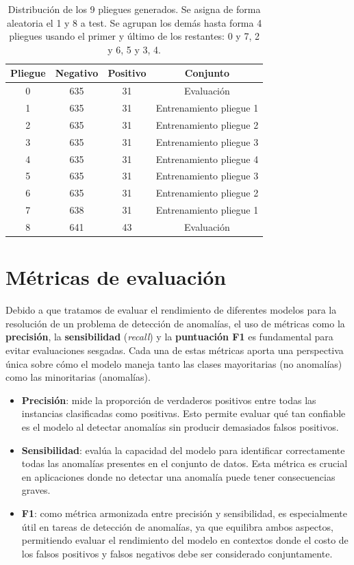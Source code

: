\documentclass[12pt,letterpaper]{article}
\begin{document}
\begin{table}[htp]
    \centering
    \begin{tabular}{cccc}
    \hline
    \textbf{Pliegue} & \textbf{Negativo} & \textbf{Positivo} & \textbf{Conjunto}\\ \hline
        0 & 635 & 31 & Evaluación \\ 
        1 & 635 & 31 & Entrenamiento pliegue 1 \\ 
        2 & 635 & 31 & Entrenamiento pliegue 2\\ 
        3 & 635 & 31 & Entrenamiento pliegue 3\\ 
        4 & 635 & 31 & Entrenamiento pliegue 4\\ 
        5 & 635 & 31 & Entrenamiento pliegue 3\\ 
        6 & 635 & 31 & Entrenamiento pliegue 2 \\
        7 & 638 & 31 & Entrenamiento pliegue 1\\ 
        8 & 641 & 43 & Evaluación \\ \hline
    \end{tabular}
    \caption{Distribución de los 9 pliegues generados. Se asigna de forma aleatoria el 1 y 8 a test. Se agrupan los demás hasta forma 4 pliegues usando el primer y último de los restantes: 0 y 7, 2 y 6, 5 y 3, 4.}
    \label{tab:ValidacionCruzada}
\end{table}

\section{Métricas de evaluación}\label{sec:Metricas}

Debido a que tratamos de evaluar el rendimiento de diferentes modelos para la resolución de un problema de detección de anomalías, 
el uso de métricas como la \textbf{precisión}, la \textbf{sensibilidad} (\textit{recall}) y la \textbf{puntuación F1} es fundamental para evitar evaluaciones sesgadas. 
Cada una de estas métricas aporta una perspectiva única sobre cómo el modelo maneja tanto las clases mayoritarias (no anomalías) como las minoritarias (anomalías).

\begin{itemize}
    \item \textbf{Precisión}: mide la proporción de verdaderos positivos entre todas las instancias clasificadas como positivas. Esto permite evaluar qué tan confiable es el modelo al detectar anomalías sin producir demasiados falsos positivos.
    \item \textbf{Sensibilidad}: evalúa la capacidad del modelo para identificar correctamente todas las anomalías presentes en el conjunto de datos. Esta métrica es crucial en aplicaciones donde no detectar una anomalía puede tener consecuencias graves.
    \item \textbf{F1}: como métrica armonizada entre precisión y sensibilidad, es especialmente útil en tareas de detección de anomalías, ya que equilibra ambos aspectos, permitiendo evaluar el rendimiento del modelo en contextos donde el costo de los falsos positivos y falsos negativos debe ser considerado conjuntamente.
\end{itemize}
\end{document}
